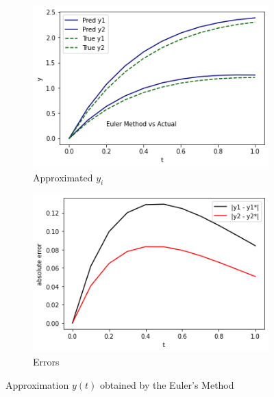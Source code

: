\documentclass[12pt,oneside]{book}
\begin{document}
		\begin{figure}[h!]
			\centering
			\begin{subfigure}[h]{0.47\textwidth}
				\centering
				\includegraphics[width=\textwidth]{euler}
				\caption{Approximated $ y_{i} $}
			\end{subfigure}
			\hfill
			\begin{subfigure}[h]{0.47\textwidth}
				\centering
				\includegraphics[width=\textwidth]{euler_err}
				\caption{Errors}
			\end{subfigure}
			\caption{Approximation $ y(t) $ obtained by the Euler's Method}
			\label{fig:euler}
		\end{figure}
	
\end{document}
